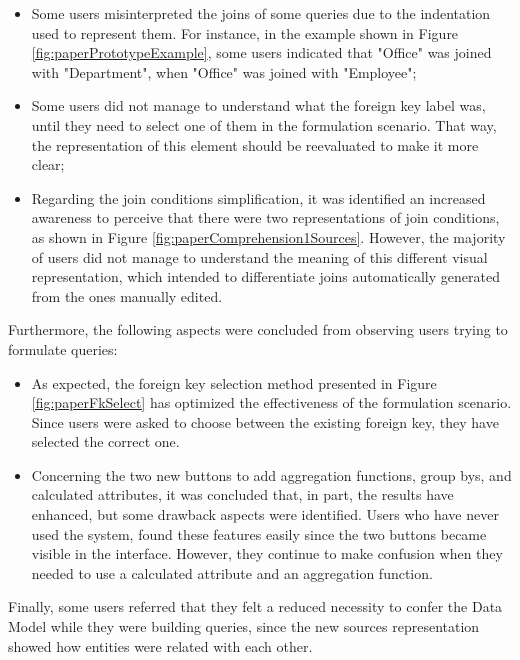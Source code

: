 \begin{itemize}
  \item Some users misinterpreted the joins of some queries due to the indentation used to represent them. For instance, in the example shown in Figure \ref{fig:paperPrototypeExample}, some users indicated that "Office" was joined with "Department", when "Office" was joined with "Employee";
  \item Some users did not manage to understand what the foreign key label was, until they need to select one of them in the formulation scenario. That way, the representation of this element should be reevaluated to make it more clear;
  \item Regarding the join conditions simplification, it was identified an increased awareness to perceive that there were two representations of join conditions, as shown in Figure \ref{fig:paperComprehension1Sources}. However, the majority of users did not manage to understand the meaning of this different visual representation, which intended to differentiate joins automatically generated from the ones manually edited.
\end{itemize}

Furthermore, the following aspects were concluded from observing users trying to formulate queries:

\begin{itemize}
  \item As expected, the foreign key selection method presented in Figure \ref{fig:paperFkSelect} has optimized the effectiveness of the formulation scenario. Since users were asked to choose between the existing foreign key, they have selected the correct one.
  \item Concerning the two new buttons to add aggregation functions, group bys, and calculated attributes, it was concluded that, in part, the results have enhanced, but some drawback aspects were identified. Users who have never used the system, found these features easily since the two buttons became visible in the interface. However, they continue to make confusion when they needed to use a calculated attribute and an aggregation function.
\end{itemize}

Finally, some users referred that they felt a reduced necessity to confer the Data Model while they were building queries, since the new sources representation showed how entities were related with each other.


